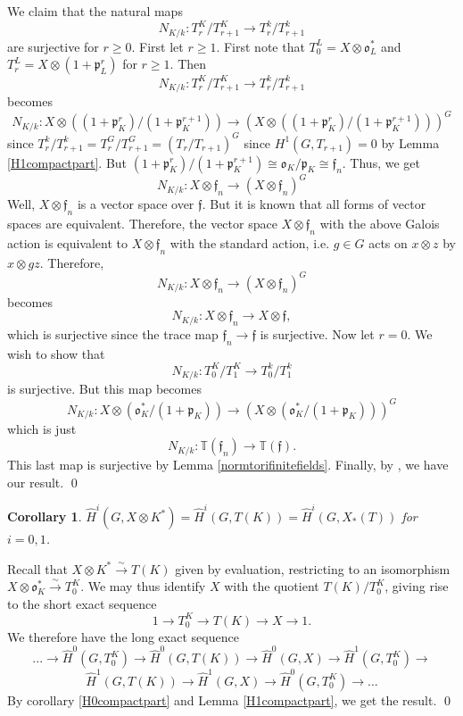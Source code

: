 \documentclass[11pt]{amsart}
\theoremstyle{plain}
\newtheorem{corollary}[enumi]{Corollary}
\begin{document}
\proof
We claim that the natural maps $$N_{K/k} : T_r^K / T_{r+1}^K \rightarrow T_r^k / T_{r+1}^k$$ are surjective for $r \geq 0$.  First let $r \geq 1$.  First note that $T_0^L = X \otimes \mathfrak{o}_L^*$ and $T_r^L = X \otimes (1 + \mathfrak{p}_L^r)$ for $r \geq 1$.  Then $$N_{K/k} : T_r^K / T_{r+1}^K \rightarrow T_r^k / T_{r+1}^k$$ becomes $$N_{K/k} : X \otimes \left( (1 + \mathfrak{p}_K^r) / (1 + \mathfrak{p}_K^{r+1}) \right) \rightarrow (X \otimes \left( (1 + \mathfrak{p}_K^r) / (1 + \mathfrak{p}_K^{r+1}) \right) )^G$$
since $T_r^k / T_{r+1}^k = T_r^G / T_{r+1}^G = (T_r / T_{r+1})^G$ since $H^1(G, T_{r+1}) = 0$ by Lemma \ref{H1compactpart}.  But $(1 + \mathfrak{p}_K^r) / (1 + \mathfrak{p}_K^{r+1}) \cong \mathfrak{o}_K / \mathfrak{p}_K \cong \mathfrak{f}_n$.  Thus, we get
$$N_{K/k} : X \otimes \mathfrak{f}_n \rightarrow (X \otimes \mathfrak{f}_n)^G$$
Well, $X \otimes \mathfrak{f}_n$ is a vector space over $\mathfrak{f}$.  But it is known that all forms of vector spaces are equivalent.  Therefore, the vector space $X \otimes \mathfrak{f}_n$ with the above Galois action is equivalent to $X \otimes \mathfrak{f}_n$ with the standard action, i.e. $g \in G$ acts on $x \otimes z$ by $x \otimes gz$.  Therefore, $$N_{K/k} : X \otimes \mathfrak{f}_n \rightarrow (X \otimes \mathfrak{f}_n)^G$$ becomes
$$N_{K/k} : X \otimes \mathfrak{f}_n \rightarrow X \otimes \mathfrak{f},$$
which is surjective since the trace map $\mathfrak{f}_n \rightarrow \mathfrak{f}$ is surjective.  Now let $r = 0$.  We wish to show that $$N_{K/k} : T_0^K / T_1^K \rightarrow T_0^k / T_1^k$$ is surjective.  But this map becomes
$$N_{K/k} : X \otimes \left( \mathfrak{o}_K^* / (1 + \mathfrak{p}_K) \right) \rightarrow (X \otimes \left( \mathfrak{o}_K^* / (1 + \mathfrak{p}_K) \right) )^G$$ which is just
$$N_{K/k} : \mathbb{T}(\mathfrak{f}_n) \rightarrow \mathbb{T}(\mathfrak{f}).$$
This last map is surjective by Lemma \ref{normtorifinitefields}.  Finally, by \cite[Lemma 2, p. 81]{serre1}, we have our result.
\qed

\begin{corollary}\label{reductiontori}
$\hat{H}^i(G, X \otimes K^*) = \hat{H}^i(G, T(K)) = \hat{H}^i(G,X_*(T))$ for $i=0,1$.
\end{corollary}

\proof
Recall that $X \otimes K^* \xrightarrow{\sim} T(K)$ given by evaluation, restricting to an isomorphism $X \otimes \mathfrak{o}_K^* \xrightarrow{\sim} T_0^K$.  We may thus identify $X$ with the quotient $T(K) / T_0^K$, giving rise to the short exact sequence $$1 \rightarrow T_0^K \rightarrow T(K) \rightarrow X \rightarrow 1.$$  We therefore have the long exact sequence $$... \rightarrow \hat{H}^0(G, T_0^K) \rightarrow \hat{H}^0(G, T(K)) \rightarrow \hat{H}^0(G, X) \rightarrow \hat{H}^1(G, T_0^K) \rightarrow $$ $$\hat{H}^1(G, T(K)) \rightarrow \hat{H}^1(G, X) \rightarrow \hat{H}^0(G, T_0^K) \rightarrow ...$$
By corollary \ref{H0compactpart} and Lemma \ref{H1compactpart}, we get the result.
\qed
\end{document}
